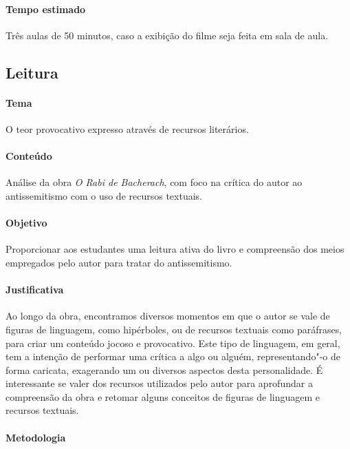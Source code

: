 \documentclass[12pt]{extarticle}
\begin{document}
\paragraph{Tempo estimado} Três aulas de 50 minutos, caso a 
exibição do filme seja feita em sala de aula.


\subsection{Leitura}

\paragraph{Tema} O teor provocativo expresso através de recursos literários.

\paragraph{Conteúdo} Análise da obra \emph{O Rabi de Bacherach}, 
com foco na crítica do autor ao antissemitismo com o uso de recursos textuais.

\paragraph{Objetivo} Proporcionar aos estudantes uma leitura ativa do livro
e compreensão dos meios empregados pelo autor para tratar do antissemitismo.

\paragraph{Justificativa} Ao longo da obra, encontramos diversos momentos em que o
autor se vale de figuras de linguagem, como hipérboles, ou de recursos
textuais como paráfrases, para criar um conteúdo jocoso e provocativo.
Este tipo de linguagem, em geral, tem a intenção de performar uma
crítica a algo ou alguém, representando"-o de forma caricata, exagerando
um ou diversos aspectos desta personalidade. É interessante se valer dos recursos
utilizados pelo autor para aprofundar a compreensão da obra e retomar alguns conceitos
de figuras de linguagem e recursos textuais.

\paragraph{Metodologia}
\end{document}
